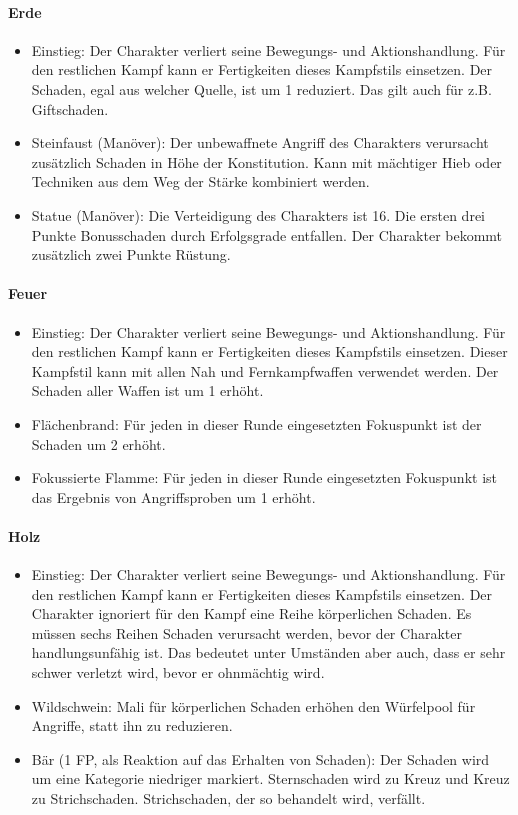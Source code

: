 \documentclass{article}
\begin{document}
\paragraph{Erde}

\begin{itemize}
\item Einstieg: Der Charakter verliert seine Bewegungs- und Aktionshandlung. Für den restlichen Kampf kann er Fertigkeiten dieses Kampfstils einsetzen. Der Schaden, egal aus welcher Quelle, ist um 1 reduziert. Das gilt auch für z.B. Giftschaden.
\item Steinfaust (Manöver): Der unbewaffnete Angriff des Charakters verursacht zusätzlich Schaden in Höhe der Konstitution. Kann mit mächtiger Hieb oder Techniken aus dem Weg der Stärke kombiniert werden.
\item Statue (Manöver): Die Verteidigung des Charakters ist 16. Die ersten drei Punkte Bonusschaden durch Erfolgsgrade entfallen. Der Charakter bekommt zusätzlich zwei Punkte Rüstung.
\end{itemize}

\paragraph{Feuer}

\begin{itemize}
\item Einstieg: Der Charakter verliert seine Bewegungs- und Aktionshandlung. Für den restlichen Kampf kann er Fertigkeiten dieses Kampfstils einsetzen. Dieser Kampfstil kann mit allen Nah und Fernkampfwaffen verwendet werden. Der Schaden aller Waffen ist um 1 erhöht.
\item Flächenbrand: Für jeden in dieser Runde eingesetzten Fokuspunkt ist der Schaden um 2 erhöht.
\item Fokussierte Flamme: Für jeden in dieser Runde eingesetzten Fokuspunkt ist das Ergebnis von Angriffsproben um 1 erhöht.
\end{itemize}

\paragraph{Holz}

\begin{itemize}
\item Einstieg: Der Charakter verliert seine Bewegungs- und Aktionshandlung. Für den restlichen Kampf kann er Fertigkeiten dieses Kampfstils einsetzen. Der Charakter ignoriert für den Kampf eine Reihe körperlichen Schaden. Es müssen sechs Reihen Schaden verursacht werden, bevor der Charakter handlungsunfähig ist. Das bedeutet unter Umständen aber auch, dass er sehr schwer verletzt wird, bevor er ohnmächtig wird.
\item Wildschwein: Mali für körperlichen Schaden erhöhen den Würfelpool für Angriffe, statt ihn zu reduzieren.
\item Bär (1 FP, als Reaktion auf das Erhalten von Schaden): Der Schaden wird um eine Kategorie niedriger markiert. Sternschaden wird zu Kreuz und Kreuz zu Strichschaden. Strichschaden, der so behandelt wird, verfällt.
\end{itemize}
\end{document}
